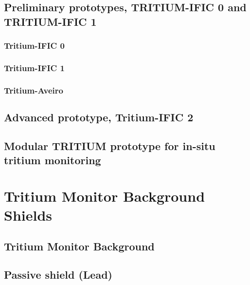 \documentclass[12pt,a4paper]{book}
\begin{document}
	\section[Preliminary prototypes]{Preliminary prototypes, TRITIUM-IFIC 0 and TRITIUM-IFIC 1}\label{Preliminary_prototypes}
		\subsection{Tritium-IFIC 0}
		\newpage
		
		\subsection{Tritium-IFIC 1}
		\newpage
		
		\subsection{Tritium-Aveiro}
		\newpage
		
	\section[Tritium-IFIC 2]{Advanced prototype, Tritium-IFIC 2}
		\newpage
		
	\section[Modular TRITIUM prototype]{Modular TRITIUM prototype for in-situ tritium monitoring}
		\newpage
		
\chapter[Background Shields]{Tritium Monitor Background Shields}\label{chap:Shields}
	\section{Tritium Monitor Background}
	\newpage
		
	\section{Passive shield (Lead)}
		
\end{document}
